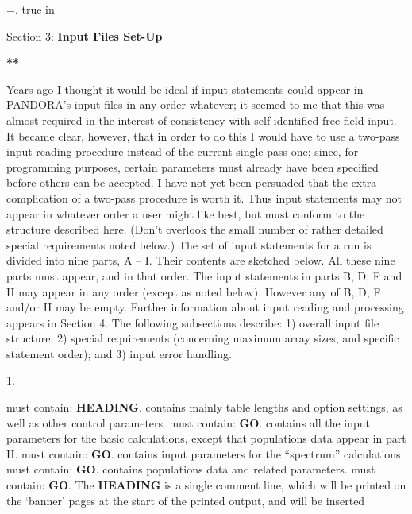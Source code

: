 %
\newtoks\footline \footline={\hss{}.\folio\hss}
\top
{} true in
\centerline{Section 3: {\bf Input Files Set-Up}}
\blankline
\blankline
\centerline{\bf ***}
\blankline
\blankline
Years ago I thought it would be ideal if input statements could appear in
PANDORA's input files in any order whatever; it seemed to me that this
was almost required in the interest of consistency with self-identified
free-field input. It became clear, however, that in order to do this
I would have to use a two-pass input reading procedure instead of the
current single-pass one; since, for programming purposes, certain parameters
must already have been specified before others can be accepted. I have not
yet been persuaded that the extra complication of a two-pass procedure
is worth it. Thus input statements may not appear in whatever order a
user might like best, but must conform to the structure described here.
(Don't overlook the small number of rather detailed special requirements
noted below.)
\blankline
The set of input statements for a run is divided into nine parts, A -- I.
Their contents are sketched below. All these nine parts must appear,
and in that order. The input statements in parts B, D, F and H may appear
in any order (except as noted below). However any of
B, D, F and/or H may be empty. Further information about input
reading and processing appears in Section 4. 
\blankline
The following subsections describe: 1) overall input file structure;
2) special requirements (concerning maximum array sizes, and specific
statement order); and 3) input error handling.
\ej
\centerline{1. }
\blankline
\blankline
{} must contain: {\bf HEADING}.
\blankline
{} contains mainly table lengths and option settings,
as well as other control parameters.
\blankline
{} must contain: {\bf GO}.
\blankline
{} contains all the input parameters for the basic
calculations, except that populations data appear in part H.
\blankline
{} must contain: {\bf GO}.
\blankline
{} contains input parameters for the ``spectrum''
calculations.
\blankline
{} must contain: {\bf GO}.
\blankline
{} contains populations data and related parameters.
\blankline
{} must contain: {\bf GO}.
\blankline
\blankline
\blankline
\blankline
\blankline
\blankline
\blankline
The {\bf HEADING} is a single comment line, which will be printed on the
`banner' pages at the start of the printed output, and will be inserted
